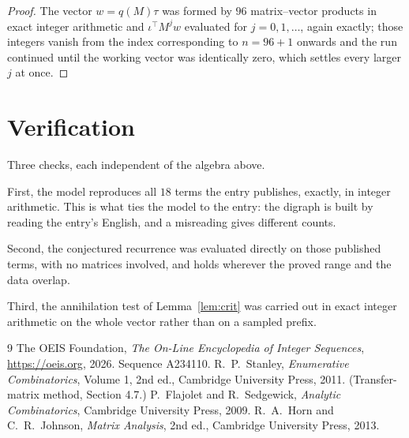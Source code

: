 \documentclass[11pt,a4paper]{article}
\theoremstyle{plain}
\theoremstyle{definition}
\begin{document}
\begin{proof}
The vector $w=q(M)\tau$ was formed by $96$ matrix--vector products in exact integer
arithmetic and $\iota^{\!\top}M^{j}w$ evaluated for $j=0,1,\dots$, again exactly; those
integers vanish from the index corresponding to $n=96+1$ onwards and the run continued
until the working vector was identically zero, which settles every larger $j$ at once.
\end{proof}

\section{Verification}

Three checks, each independent of the algebra above.

First, the model reproduces all $18$ terms the entry publishes, exactly, in integer
arithmetic. This is what ties the model to the entry: the digraph is built by reading the
entry's English, and a misreading gives different counts.

Second, the conjectured recurrence was evaluated directly on those published terms, with no
matrices involved, and holds wherever the proved range and the data overlap.

Third, the annihilation test of Lemma~\ref{lem:crit} was carried out in exact integer
arithmetic on the whole vector rather than on a sampled prefix.

\begin{thebibliography}{9}
 The OEIS Foundation, \emph{The On-Line Encyclopedia of Integer
Sequences}, \url{https://oeis.org}, 2026. Sequence A234110.
 R.~P.~Stanley, \emph{Enumerative Combinatorics}, Volume 1, 2nd ed.,
Cambridge University Press, 2011. (Transfer-matrix method, Section 4.7.)
 P.~Flajolet and R.~Sedgewick, \emph{Analytic Combinatorics}, Cambridge
University Press, 2009.
 R.~A.~Horn and C.~R.~Johnson, \emph{Matrix Analysis}, 2nd ed., Cambridge
University Press, 2013.
\end{thebibliography}
\end{document}
